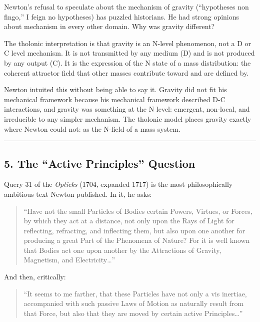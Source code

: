 \documentclass[
  11pt,
  letterpaper,
]{article}
\begin{document}
Newton's refusal to speculate about the mechanism of gravity
(``hypotheses non fingo,'' I feign no hypotheses) has puzzled
historians. He had strong opinions about mechanism in every other
domain. Why was gravity different?

The tholonic interpretation is that gravity is an N-level phenomenon,
not a D or C level mechanism. It is not transmitted by any medium (D)
and is not produced by any output (C). It is the expression of the N
state of a mass distribution: the coherent attractor field that other
masses contribute toward and are defined by.

Newton intuited this without being able to say it. Gravity did not fit
his mechanical framework because his mechanical framework described D-C
interactions, and gravity was something at the N level: emergent,
non-local, and irreducible to any simpler mechanism. The tholonic model
places gravity exactly where Newton could not: as the N-field of a mass
system.

\begin{center}\rule{0.5\linewidth}{0.5pt}\end{center}

\subsection{5. The ``Active Principles''
Question}\label{the-active-principles-question}

Query 31 of the \emph{Opticks} (1704, expanded 1717) is the most
philosophically ambitious text Newton published. In it, he asks:

\begin{quote}
``Have not the small Particles of Bodies certain Powers, Virtues, or
Forces, by which they act at a distance, not only upon the Rays of Light
for reflecting, refracting, and inflecting them, but also upon one
another for producing a great Part of the Phenomena of Nature? For it is
well known that Bodies act one upon another by the Attractions of
Gravity, Magnetism, and Electricity\ldots{}''
\end{quote}

And then, critically:

\begin{quote}
``It seems to me farther, that these Particles have not only a vis
inertiae, accompanied with such passive Laws of Motion as naturally
result from that Force, but also that they are moved by certain active
Principles\ldots{}''
\end{quote}
\end{document}
